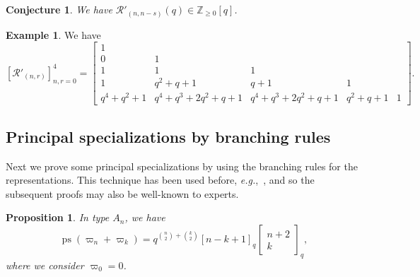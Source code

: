 \documentclass[11pt, leqno]{amsart}
\theoremstyle{plain}
\newtheorem{proposition}[theorem]{Proposition}
\newtheorem{conjecture}[theorem]{Conjecture}
\theoremstyle{definition}
\newtheorem{example}[theorem]{Example}
\numberwithin{equation}{section}
\newcommand{\Rior}{\mathcal{R}} %
\newcommand{\qbinom}[3]{\left[ \begin{matrix} #1 \\ #2 \end{matrix} \right]_{#3}} %
\newcommand{\Z}{\mathbb{Z}}
\newcommand{\ps}{\operatorname{ps}} %
\begin{document}
\begin{conjecture}
We have $\Rior'_{(n,n-s)}(q) \in \Z_{\geq 0}[q]$.
\end{conjecture}

\begin{example}
We have
\[
[ \Rior'_{(n,r)} ]_{n,r=0}^4 =
\begin{bmatrix}
 1 \\
 0 & 1 \\
 1 & 1 & 1 \\
 1 & q^2 + q + 1 & q + 1 & 1 \\
 q^4 + q^2 + 1 & q^4 + q^3 + 2q^2 + q + 1 & q^4 + q^3 + 2q^2 + q + 1  & q^2 + q + 1 & 1
\end{bmatrix}.
\]
\end{example}








\subsection{Principal specializations by branching rules}

Next we prove some principal specializations by using the branching rules for the representations. This technique has been used before, \textit{e.g.},~\cite{Rains06}, and so the subsequent proofs may also be well-known to experts.

\begin{proposition}
\label{prop:likely_stanley}
In type $A_n$, we have
\[
\ps(\varpi_n + \varpi_k) = q^{\binom{n}{2} + \binom{k}{2}} [n-k+1]_q \qbinom{n+2}{k}{q},
\]
where we consider $\varpi_0 = 0$.
\end{proposition}
\end{document}
